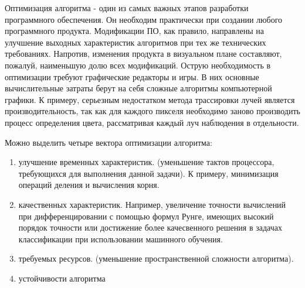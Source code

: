 \Introduction

 Оптимизация алгоритма - один из самых важных этапов разработки программного обеспечения. Он необходим практически при создании любого программного продукта. Модификации ПО, как правило, направлены на улучшение выходных характеристик алгоритмов при тех же технических требованиях. Напротив, изменения  продукта в визуальном плане составляют, пожалуй, наименьшую долю всех модификаций. Острую необходимость в оптимизации  требуют графические редакторы и игры. В них основные вычислительные затраты берут на себя сложные алгоритмы компьютерной графики. К примеру, серьезным недостатком метода трассировки лучей является производительность, так как для каждого пикселя необходимо заново производить процесс определения цвета, рассматривая каждый луч наблюдения в отдельности.
 
Можно выделить четыре вектора оптимизации алгоритма: 
\begin{enumerate}
\item улучшение временных характеристик. (уменьшение тактов процессора, требующихся для выполнения данной задачи). К примеру, минимизация операций деления и вычисления корня. 
\item качественных характеристик. Например, увеличение точности вычислений при дифференцировании с помощью формул Рунге, имеющих высокий порядок точности или достижение более качесвенного решения в задачах классификации  при использовании машинного обучения.
\item требуемых ресурсов. (уменьшение пространственной сложности алгоритма).
\item устойчивости алгоритма 
\end{enumerate}
 
 
 
 
 
 
 
